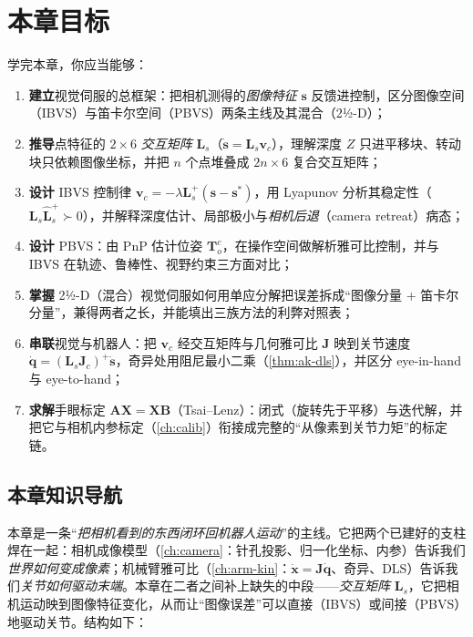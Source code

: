 \section*{本章目标}
学完本章，你应当能够：
\begin{enumerate}
  \item \textbf{建立}视觉伺服的总框架：把相机测得的\emph{图像特征} $\mathbf{s}$ 反馈进控制，区分图像空间（IBVS）与笛卡尔空间（PBVS）两条主线及其混合（2½-D）；
  \item \textbf{推导}点特征的 $2\times6$ \emph{交互矩阵} $\mathbf{L}_s$（$\dot{\mathbf{s}}=\mathbf{L}_s\mathbf{v}_c$），理解深度 $Z$ 只进平移块、转动块只依赖图像坐标，并把 $n$ 个点堆叠成 $2n\times6$ 复合交互矩阵；
  \item \textbf{设计} IBVS 控制律 $\mathbf{v}_c=-\lambda\mathbf{L}_s^{+}(\mathbf{s}-\mathbf{s}^\ast)$，用 Lyapunov 分析其稳定性（$\mathbf{L}_s\widehat{\mathbf{L}}_s^{+}\succ0$），并解释深度估计、局部极小与\emph{相机后退}（camera retreat）病态；
  \item \textbf{设计} PBVS：由 PnP 估计位姿 $\mathbf{T}_o^c$，在操作空间做解析雅可比控制，并与 IBVS 在轨迹、鲁棒性、视野约束三方面对比；
  \item \textbf{掌握} 2½-D（混合）视觉伺服如何用单应分解把误差拆成“图像分量 + 笛卡尔分量”，兼得两者之长，并能填出三族方法的利弊对照表；
  \item \textbf{串联}视觉与机器人：把 $\mathbf{v}_c$ 经交互矩阵与几何雅可比 $\mathbf{J}$ 映到关节速度 $\dot{\mathbf{q}}=(\mathbf{L}_s\mathbf{J}_c)^{+}\dot{\mathbf{s}}$，奇异处用阻尼最小二乘（\cref{thm:ak-dls}），并区分 eye-in-hand 与 eye-to-hand；
  \item \textbf{求解}手眼标定 $\mathbf{A}\mathbf{X}=\mathbf{X}\mathbf{B}$（Tsai--Lenz）：闭式（旋转先于平移）与迭代解，并把它与相机内参标定（\cref{ch:calib}）衔接成完整的“从像素到关节力矩”的标定链。
\end{enumerate}

\subsection*{本章知识导航}
本章是一条“\emph{把相机看到的东西闭环回机器人运动}”的主线。它把两个已建好的支柱焊在一起：相机成像模型（\cref{ch:camera}：针孔投影、归一化坐标、内参）告诉我们\emph{世界如何变成像素}；机械臂雅可比（\cref{ch:arm-kin}：$\dot{\mathbf{x}}=\mathbf{J}\dot{\mathbf{q}}$、奇异、DLS）告诉我们\emph{关节如何驱动末端}。本章在二者之间补上缺失的中段——\emph{交互矩阵} $\mathbf{L}_s$，它把相机运动映到图像特征变化，从而让“图像误差”可以直接（IBVS）或间接（PBVS）地驱动关节。结构如下：

